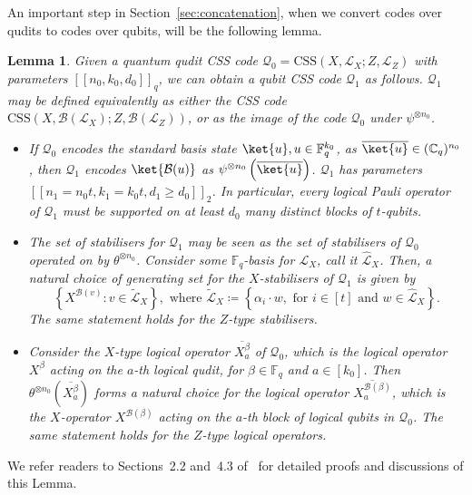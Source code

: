 \documentclass[11pt]{article}
\newtheorem{lemma}[theorem]{Lemma}
\theoremstyle{definition}
\renewcommand{\ge}{\geqslant}
\newcommand{\CSS}{\text{CSS}}
\newcommand{\cL}{\mathcal{L}}
\newcommand{\qcode}{\mathcal{Q}}
\newcommand{\FF}{\mathbb{F}}
\newcommand*{\ol}{\overline}
\newcommand{\B}{\mathcal{B}}
\begin{document}
An important step in Section~\ref{sec:concatenation}, when we convert codes over qudits to codes over qubits, will be the following lemma. 
\begin{lemma}\label{lem:self-dual-embedding}
Given a quantum qudit CSS code $\qcode_0 = \CSS(X,\cL_X;Z, \cL_Z)$ with parameters $[[n_0,k_0,d_0]]_q$, we can obtain a qubit CSS code $\qcode_1$ as follows. $\qcode_1$ may be defined equivalently as either the CSS code $\CSS(X, \B(\cL_X); Z, \B(\cL_Z))$, or as the image of the code $\qcode_0$ under $\psi^{\otimes n_0}$.
\begin{itemize}
    \item If $\qcode_0$ encodes the standard basis state $\ket{u}, u\in \FF_q^{k_0}$, as $\ol{\ket{u}} \in (\mathbb{C}_q)^{n_0}$, then $\qcode_1$ encodes $\ket{\B(u)}$ as $\psi^{\otimes n_0}\left(\overline{\ket{u}}\right)$. $\qcode_1$ has parameters $[[n_1 = n_0t, k_1 = k_0t, d_1\ge d_0]]_2$. In particular, every logical Pauli operator of $\qcode_1$ must be supported on at least $d_0$ many distinct blocks of $t$-qubits.
    \item The set of stabilisers for $\qcode_1$ may be seen as the set of stabilisers of $\qcode_0$ operated on by $\theta^{\otimes n_0}$. Consider some $\mathbb{F}_q$-basis for $\mathcal{L}_X$, call it $\hat{\mathcal{L}}_X$. Then, a natural choice of generating set for the $X$-stabilisers of $\qcode_1$ is given by
    \begin{equation}
        \left\{X^{\mathcal{B}(v)}: v \in \tilde{\mathcal{L}}_X\right\}, \text{ where } \tilde{\mathcal{L}}_X \coloneq \left\{\alpha_i\cdot w, \text{ for }i \in [t] \text{ and } w \in \hat{\mathcal{L}}_X\right\}.
    \end{equation}
    The same statement holds for the $Z$-type stabilisers.
    \item Consider the $X$-type logical operator $\overline{X^\beta_a}$ of $\qcode_0$, which is the logical operator $X^\beta$ acting on the $a$-th logical qudit, for $\beta \in \mathbb{F}_q$ and $a \in [k_0]$. Then $\theta^{\otimes n_0}\left(\overline{X^\beta_a}\right)$ forms a natural choice for the logical operator $\overline{X^{\B(\beta)}_a}$, which is the $X$-operator $X^{\B(\beta)}$ acting on the $a$-th block of logical qubits in $\qcode_0$. The same statement holds for the $Z$-type logical operators.
\end{itemize}
\end{lemma}
We refer readers to Sections~2.2 and~4.3 of~\cite{wills2024constant} for detailed proofs and discussions of this Lemma.
\end{document}
